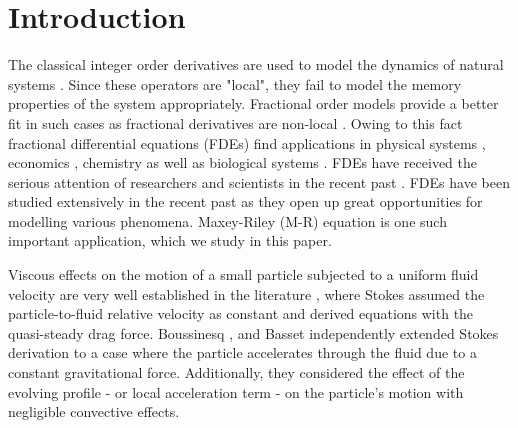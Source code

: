 \documentclass[pdflatex,sn-mathphys]{sn-jnl}%
\theoremstyle{thmstyleone}%
\theoremstyle{thmstyletwo}%
\theoremstyle{thmstylethree}%
\begin{document}



\maketitle

\section{Introduction}\label{intro}
The classical integer order derivatives are used to model the dynamics of natural systems \cite{borzi2020modelling, moghadas2018mathematical}. Since these operators are "local", they fail to model the memory properties of the system appropriately. Fractional order models provide a better fit in such cases as fractional derivatives are non-local \cite{volterra1932theory, podlubny1998fractional}. Owing to this fact fractional differential equations (FDEs) find applications in physical systems \cite{ kobayashi2005stability,coimbra2000unsteady}, economics \cite{tarasov2020mathematical}, chemistry \cite{bolster2017upscaling}  as well as biological systems \cite{ionescu2017role,magin2010fractional}. FDEs have received the serious attention of researchers and scientists in the recent past \cite{daftardar2019fractional}. FDEs have been studied extensively in the recent past as they open up great opportunities for modelling various phenomena. Maxey-Riley (M-R) equation is one such important application, which we study in this paper.


Viscous effects on the motion of a small particle subjected to a uniform fluid velocity are very well established in the literature \cite{stokes1851effect}, where Stokes  assumed the particle-to-fluid relative velocity as constant and derived equations with the quasi-steady drag force. Boussinesq \cite{boussinesq1885resistance}, and Basset \cite{basset1887motion} independently extended Stokes derivation to a case where the particle accelerates through the fluid due to a constant gravitational force. Additionally, they considered the effect of the evolving profile - or local acceleration term - on the particle's motion with negligible convective effects. 
\end{document}
